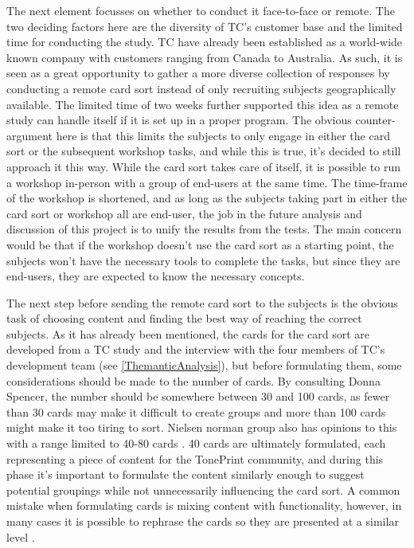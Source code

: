 The next element focusses on whether to conduct it face-to-face or remote. The two deciding factors here are the diversity of TC's customer base and the limited time for conducting the study. TC have already been established as a world-wide known company with customers ranging from Canada to Australia. As such, it is seen as a great opportunity to gather a more diverse collection of responses by conducting a remote card sort instead of only recruiting subjects geographically available. The limited time of two weeks further supported this idea as a remote study can handle itself if it is set up in a proper program. The obvious counter-argument here is that this limits the subjects to only engage in either the card sort or the subsequent workshop tasks, and while this is true, it's decided to still approach it this way. While the card sort takes care of itself, it is possible to run a workshop in-person with a group of end-users at the same time. The time-frame of the workshop is shortened, and as long as the subjects taking part in either the card sort or workshop all are end-user, the job in the future analysis and discussion of this project is to unify the results from the tests. The main concern would be that if the workshop doesn't use the card sort as a starting point, the subjects won't have the necessary tools to complete the tasks, but since they are end-users, they are expected to know the necessary concepts.

The next step before sending the remote card sort to the subjects is the obvious task of choosing content and finding the best way of reaching the correct subjects. As it has already been mentioned, the cards for the card sort are developed from a TC study \parencite{PDF:BrugerWorkshopUserTonePrints} and the interview with the four members of TC's development team (see \autoref{ThemanticAnalysis}), but before formulating them, some considerations should be made to the number of cards. By consulting Donna Spencer, the number should be somewhere between 30 and 100 cards, as fewer than 30 cards may make it difficult to create groups and more than 100 cards might make it too tiring to sort. Nielsen norman group also has opinions to this with a range limited to 40-80 cards \parencite{WEB:NielsenNormanCardSort}. 40 cards are ultimately formulated, each representing a piece of content for the TonePrint community, and during this phase it's important to formulate the content similarly enough to suggest potential groupings while not unnecessarily influencing the card sort. A common mistake when formulating cards is mixing content with functionality, however, in many cases it is possible to rephrase the cards so they are presented at a similar level \parencite[][103-107]{WEB:DonnaSpencer}. 

